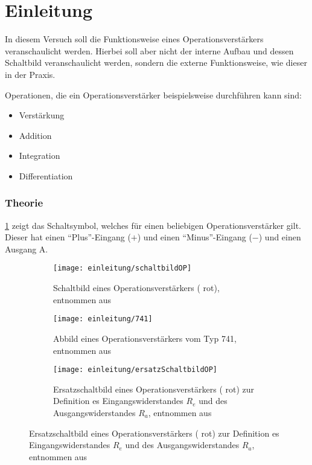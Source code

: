 \part{Einleitung}
In diesem Versuch soll die Funktionsweise eines Operationsverstärkers
veranschaulicht werden. Hierbei soll aber nicht der interne Aufbau und dessen 
Schaltbild veranschaulicht werden, sondern die externe Funktionsweise, wie 
dieser in der Praxis.

Operationen, die ein Operationsverstärker beispielsweise durchführen kann sind:
\begin{itemize}[noitemsep,nosep]
	\item Verstärkung
	\item Addition
	\item Integration
	\item Differentiation
\end{itemize}

\section{Theorie}
\cref{fig:Einleitung/SchaltbildOperationsverstärker} zeigt das Schaltsymbol, 
welches für einen beliebigen Operationsverstärker gilt. Dieser hat einen 
"`Plus"'-Eingang ($+$) und einen "`Minus"'-Eingang ($-$) und einen Ausgang A.

\begin{figure}[H]
	\centering
	\begin{subfigure}[t]{0.3\linewidth}
		\centering
		\texttt{[image: einleitung/schaltbildOP]}
		\caption{Schaltbild eines Operationsverstärkers ({\color{red} rot}), 
		entnommen aus \cite{script}}
		\label{fig:Einleitung/SchaltbildOperationsverstärker}
	\end{subfigure}
	\quad
	\begin{subfigure}[t]{0.2\linewidth}
		\centering
		\texttt{[image: einleitung/741]}
		\caption{Abbild eines Operationsverstärkers vom Typ 741, entnommen aus 
		\cite{image741}}
		\label{fig:Einleitung/Operationsverstärker}
	\end{subfigure}
	\quad
	\begin{subfigure}[t]{0.3\linewidth}
		\centering
		\texttt{[image: einleitung/ersatzSchaltbildOP]}
		\caption{Ersatzschaltbild eines Operationsverstärkers ({\color{red} 
		rot}) zur Definition es Eingangswiderstandes $R_e$ und des 
		Ausgangswiderstandes $R_a$, entnommen aus \cite{script}}
		\label{fig:Einleitung/ErsatzschaltbildOperationsverstärker}
	\end{subfigure}
\end{figure}

